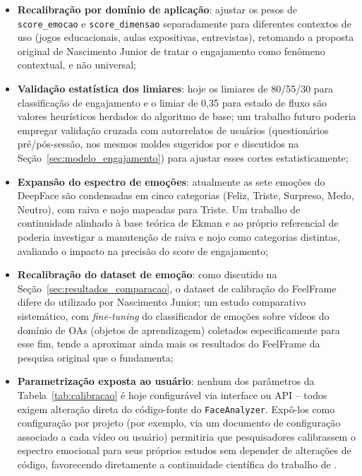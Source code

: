 \documentclass[
	12pt,
	openright,
	oneside,
	a4paper,
	english,
	brazil
	]{abntex2}
\begin{document}
\begin{itemize}
    \item \textbf{Recalibração por domínio de aplicação}: ajustar os pesos de \texttt{score\_emocao} e \texttt{score\_dimensao} separadamente para diferentes contextos de uso (jogos educacionais, aulas expositivas, entrevistas), retomando a proposta original de Nascimento Junior \cite{nascimento2024nelson} de tratar o engajamento como fenômeno contextual, e não universal;
    \item \textbf{Validação estatística dos limiares}: hoje os limiares de 80/55/30 para classificação de engajamento e o limiar de 0,35 para estado de fluxo são valores heurísticos herdados do algoritmo de base; um trabalho futuro poderia empregar validação cruzada com autorrelatos de usuários (questionários pré/pós-sessão, nos mesmos moldes sugeridos por \cite{nascimento2024nelson} e discutidos na Seção~\ref{sec:modelo_engajamento}) para ajustar esses cortes estatisticamente;
    \item \textbf{Expansão do espectro de emoções}: atualmente as sete emoções do DeepFace são condensadas em cinco categorias (Feliz, Triste, Surpreso, Medo, Neutro), com raiva e nojo mapeadas para Triste. Um trabalho de continuidade alinhado à base teórica de Ekman \cite{ekman1971constants} e ao próprio referencial de \cite{nascimento2024nelson} poderia investigar a manutenção de raiva e nojo como categorias distintas, avaliando o impacto na precisão do score de engajamento;
    \item \textbf{Recalibração do dataset de emoção}: como discutido na Seção~\ref{sec:resultados_comparacao}, o dataset de calibração do FeelFrame difere do utilizado por Nascimento Junior; um estudo comparativo sistemático, com \textit{fine-tuning} do classificador de emoções sobre vídeos do domínio de OAs (objetos de aprendizagem) coletados especificamente para esse fim, tende a aproximar ainda mais os resultados do FeelFrame da pesquisa original que o fundamenta;
    \item \textbf{Parametrização exposta ao usuário}: nenhum dos parâmetros da Tabela~\ref{tab:calibracao} é hoje configurável via interface ou API -- todos exigem alteração direta do código-fonte do \texttt{FaceAnalyzer}. Expô-los como configuração por projeto (por exemplo, via um documento de configuração associado a cada vídeo ou usuário) permitiria que pesquisadores calibrassem o espectro emocional para seus próprios estudos sem depender de alterações de código, favorecendo diretamente a continuidade científica do trabalho de \cite{nascimento2024nelson}.
\end{itemize}
\end{document}
